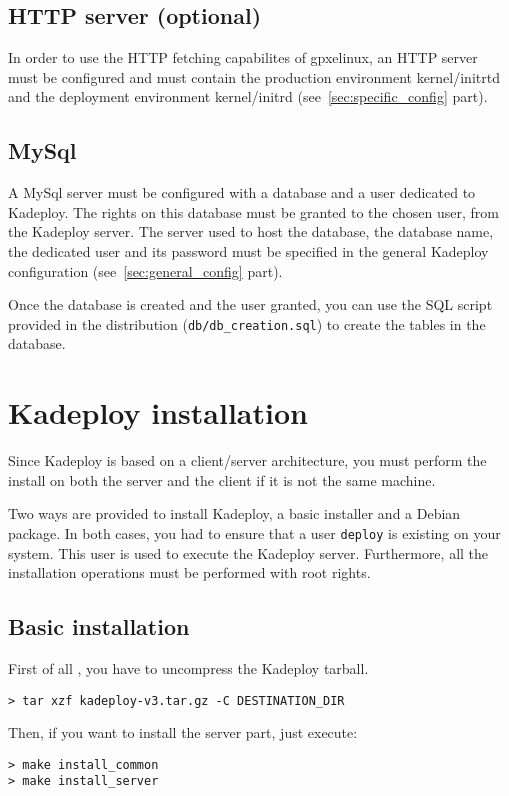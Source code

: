 \documentclass[a4wide,10pt,oneside]{book}
\begin{document}
\subsection{HTTP server (optional)}
In order to use the HTTP fetching capabilites of gpxelinux, an HTTP server must be configured and must contain the production environment kernel/initrtd and the deployment environment kernel/initrd (see~\ref{sec:specific_config} part).

\subsection{MySql}
A MySql server must be configured with a database and a user dedicated to Kadeploy. The rights on this database must be granted to the chosen user, from the Kadeploy server. The server used to host the database, the database name, the dedicated user and its password must be specified in the general Kadeploy configuration (see~\ref{sec:general_config} part).

Once the database is created and the user granted, you can use the SQL script provided in the distribution (\texttt{db/db\_creation.sql}) to create the tables in the database.

\section{Kadeploy installation}
Since Kadeploy is based on a client/server architecture, you must perform the install on both the server and the client if it is not the same machine.

Two ways are provided to install Kadeploy, a basic installer and a Debian package. In both cases, you had to ensure that a user \texttt{deploy} is existing on your system. This user is used to execute the Kadeploy server. Furthermore, all the installation operations must be performed with root rights.

\subsection{Basic installation}
First of all , you have to uncompress the Kadeploy tarball.
\begin{small}
\begin{verbatim}
> tar xzf kadeploy-v3.tar.gz -C DESTINATION_DIR
\end{verbatim}
\end{small}

\noindent Then, if you want to install the server part, just execute:
\begin{small}
\begin{verbatim}
> make install_common
> make install_server
\end{verbatim}
\end{small}
\end{document}

